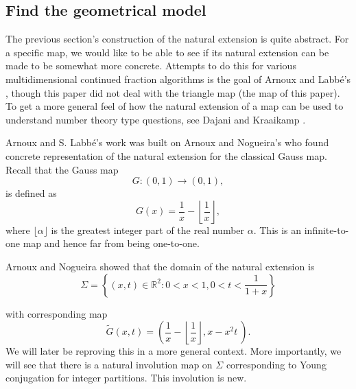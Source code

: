 \documentclass[12pt,oneside,openany]{article}
\def\R{{\mathbb R}} %
\begin{document}
\subsection{Find the geometrical model } \label{m1 case} 

The previous section's construction of the natural extension is quite abstract.  For a specific map, we would like to be able to see if its  natural extension can be made to be somewhat more concrete.  Attempts to do this for various multidimensional continued fraction algorithms is the goal of   Arnoux and Labb\'{e}'s \cite{Arnoux-Labbe}, though this paper did not deal with the triangle map (the map of this paper). To get a more general feel of how the natural extension of a map can be used to understand number theory type questions, see Dajani and Kraaikamp \cite{Dajani-Kraaikamp}.

Arnoux and S. Labb\'{e}'s work was  built on Arnoux and Nogueira's \cite{Arnoux-Nogueira-93}  who found   concrete representation of the natural extension for the  classical Gauss map.  Recall that the Gauss map
$$G:(0,1) \rightarrow (0,1),$$
is defined as
$$G(x) = \frac{1}{x} - \left\lfloor \frac{1}{x} \right\rfloor,$$
where $\lfloor \alpha \rfloor$ is the greatest integer part of the real number $\alpha$.
This is an infinite-to-one map and hence far from being one-to-one. 

Arnoux and Nogueira showed that the domain of the natural extension is 
$$\Sigma = \left\{ (x, t) \in \R^2: 0<x<1, 0< t< \frac{1}{1+x} \right\}$$

 
 
 
 

\begin{center}
\end{center}
with corresponding map
$$\tilde{G}(x,t) = \left( \frac{1}{x} - \left\lfloor \frac{1}{x} \right\rfloor, x-x^2 t \ \right).$$
We will later be reproving this in a more general context.  More importantly, we will see that there is a  natural involution map on $\Sigma$ corresponding to Young conjugation for integer partitions.  This involution is new.
\end{document}
